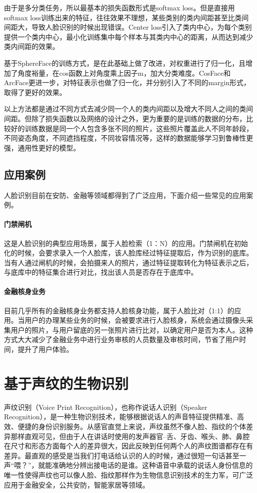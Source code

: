 \documentclass[graybox,envcountchap,sectrefs]{svmono}
\begin{document}
由于是多分类任务，所以最基本的损失函数形式是softmax loss。但是直接用softmax loss训练出来的特征，往往效果不理想，某些类别的类内间距甚至比类间间距大，导致人脸识别的时候出现错误。Center loss引入了类内中心，为每个类别提供一个类内中心，最小化训练集中每个样本与其类内中心的距离，从而达到减少类内间距的效果。

基于SphereFace的训练方式，是在此基础上做了改进，对权重进行了归一化，且增加了角度裕量，在cos函数上对角度乘上因子m，加大分类难度。CosFace和ArcFace更进一步，对特征表示也做了归一化，并分别引入了不同的margin形式，取得了更好的效果。

以上方法都是通过不同方式去减少同一个人的类内间距以及增大不同人之间的类间间距。但除了损失函数以及网络的设计之外，更为重要的是训练的数据的分布，比较好的训练数据是同一个人包含多张不同的照片，这些照片覆盖此人不同年龄段，不同姿态角度，不同遮挡程度，不同妆容情况等，这样的数据能够学习到鲁棒性更强，通用性更好的模型。

\subsection{应用案例}

人脸识别目前在安防、金融等领域都得到了广泛应用，下面介绍一些常见的应用案例。
\paragraph{门禁闸机}
这是人脸识别的典型应用场景，属于人脸检索（1：N）的应用。门禁闸机在初始化的时候，会要求录入一个人脸库，该人脸库经过特征提取后，作为识别的底库。当有人通过闸机的时候，会拍摄来人的照片，通过特征提取转化为特征表示之后，与底库中的特征集合进行对比，找出该人员是否存在于底库中。
\paragraph{金融核身业务}
目前几乎所有的金融核身业务都支持人脸核身功能，属于人脸比对（1:1）的应用。当用户的办理某些业务的时候，会被要求进行人脸核身，系统会通过摄像头采集用户的照片，与用户留底的另一张照片进行比对，以确定用户是否为本人。这种方式大大减少了金融业务中进行业务审核的人员数量及审核时间，节省了用户时间，提升了用户体验。


\section{基于声纹的生物识别}
\label{voiceprint}

声纹识别（Voice Print Recognition），也称作说话人识别（Speaker Recognition），是一种生物识别技术，能够根据说话人的声音特征提供精准、高效、便捷的身份识别服务。从感官直觉上来说，声纹虽然不像人脸、指纹的个体差异那样直观可见，但由于人在讲话时使用的发声器官--舌、牙齿、喉头、肺、鼻腔在尺寸和形态方面每个人的差异很大，因此反映到任何两个人的声纹图谱都存在有差异。最直观的感受是当我们打电话给认识的人的时候，通过很短一句话甚至一声“喂？”，就能准确地分辨出接电话的是谁。这种语音中承载的说话人身份信息的唯一性使得声纹也可以像人脸、指纹那样作为生物信息识别技术的生力军，可广泛应用于金融安全，公共安防，智能家居等领域。
\end{document}
